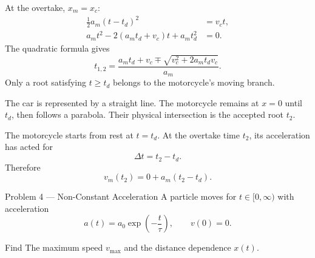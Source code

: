 \begin{solutionframe}
  \footnotesize
  \setlength{\abovedisplayskip}{3pt}
  \setlength{\belowdisplayskip}{3pt}
  At the overtake, $x_m=x_c$:
  \[
    \begin{aligned}
      \frac12a_m(t-t_d)^2&=v_ct,\\
      a_mt^2-2(a_mt_d+v_c)t+a_mt_d^2&=0.
    \end{aligned}
  \]
  The quadratic formula gives
  \[
    t_{1,2}=\frac{a_mt_d+v_c
      \mp\sqrt{v_c^2+2a_mt_dv_c}}{a_m}.
  \]
  Only a root satisfying $t\ge t_d$ belongs to the motorcycle's moving branch.
\end{solutionframe}

\begin{solutionframe}
  \centering
  \resizebox{0.78\textwidth}{!}{}
  \vspace{0.1em}

  \footnotesize
  The car is represented by a straight line. The motorcycle remains at
  $x=0$ until $t_d$, then follows a parabola. Their physical intersection is
  the accepted root $t_2$.
\end{solutionframe}

\begin{solutionframe}
  The motorcycle starts from rest at $t=t_d$. At the overtake time $t_2$, its
  acceleration has acted for
  \[
    \Delta t=t_2-t_d.
  \]
  Therefore
  \[
    v_m(t_2)=0+a_m(t_2-t_d).
  \]
\end{solutionframe}

\begin{frame}{Problem 4 — Non-Constant Acceleration}
  \vspace{0.8em}
  A particle moves for $t\in[0,\infty)$ with acceleration
  \[
    a(t)=a_0\exp\!\left(-\frac{t}{\tau}\right),
    \qquad v(0)=0.
  \]
  \vspace{0.5em}
  \begin{block}{Find}
    The maximum speed $v_{\max}$ and the distance dependence $x(t)$.
  \end{block}
\end{frame}

